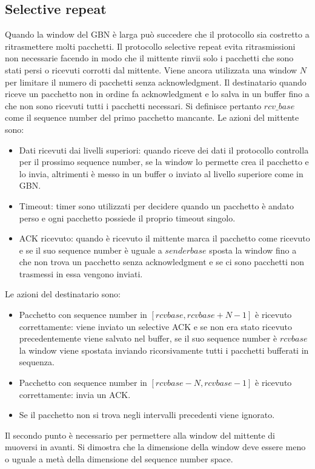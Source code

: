 \subsection{Selective repeat}
Quando la window del GBN \`e larga pu\`o succedere che il protocollo sia costretto a ritrasmettere molti pacchetti. Il protocollo selective repeat evita
ritrasmissioni non necessarie facendo in modo che il mittente rinvii solo i pacchetti che sono stati persi o ricevuti corrotti dal mittente. Viene ancora
utilizzata una window $N$ per limitare il numero di pacchetti senza acknowledgment. Il destinatario quando riceve un pacchetto non in ordine fa 
acknowledgment e lo salva in un buffer fino a che non sono ricevuti tutti i pacchetti necessari. Si definisce pertanto $rcv\_base$ come il sequence number
del primo pacchetto mancante. Le azioni del mittente sono:
\begin{itemize}
\item Dati ricevuti dai livelli superiori: quando riceve dei dati il protocollo controlla per il prossimo sequence number, se la window lo permette crea il
pacchetto e lo invia, altrimenti \`e messo in un buffer o inviato al livello superiore come in GBN.
\item Timeout: timer sono utilizzati per decidere quando un pacchetto \`e andato perso e ogni pacchetto possiede il proprio timeout singolo. 
\item ACK ricevuto: quando \`e ricevuto il mittente marca il pacchetto come ricevuto e se il suo sequence number \`e uguale a $senderbase$ sposta la window
fino a che non trova un pacchetto senza acknowledgment e se ci sono pacchetti non trasmessi in essa vengono inviati.
\end{itemize}
Le azioni del destinatario sono:
\begin{itemize}
\item Pacchetto con sequence number in $[rcvbase, rcvbase+N-1]$ \`e ricevuto correttamente: viene inviato un selective ACK e se non era stato ricevuto 
precedentemente viene salvato nel buffer, se il suo sequence number \`e $rcvbase$ la window viene spostata inviando ricorsivamente tutti i pacchetti 
bufferati in sequenza.
\item Pacchetto con sequence number in $[rcvbase-N, rcvbase-1]$ \`e ricevuto correttamente: invia un ACK.
\item Se il pacchetto non si trova negli intervalli precedenti viene ignorato.
\end{itemize}
Il secondo punto \`e necessario per permettere alla window del mittente di muoversi in avanti. Si dimostra che la dimensione della window deve essere meno o 
uguale a met\`a della dimensione del sequence number space.
